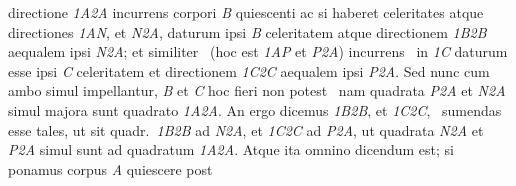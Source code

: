 %
directione \textit{{\scriptsize1}A{\scriptsize2}A} incurrens corpori \textit{B} quiescenti %
% 
%
ac si haberet celeritates atque directiones 
%
\textit{{\scriptsize1}AN}, et \textit{N{\scriptsize2}A}, daturum ipsi \textit{B}
%
celeritatem%
\protect{} atque directionem%
\protect{} \textit{{\scriptsize1}B{\scriptsize2}B} aequalem ipsi
%
\textit{N{\scriptsize2}A}; et similite\textlangle r\textrangle\ %
% 
%
(hoc est \textit{{\scriptsize1}AP} et \textit{P{\scriptsize2}A}) incurre\textlangle ns\textrangle\ %
% 
% 
%
in \textit{{\scriptsize1}C} daturum esse ipsi \textit{C} celeritatem et directionem \textit{{\scriptsize1}C{\scriptsize2}C} aequalem ipsi \textit{P{\scriptsize2}A}. 
%
Sed nunc cum ambo simul impellantur, \textit{B} et \textit{C} hoc fieri non pot\textlangle est\textrangle\
%
nam quadrata \textit{P{\scriptsize2}A} et \textit{N{\scriptsize2}A} simul majora sunt quadrato \textit{{\scriptsize1}A{\scriptsize2}A}. 
%
An ergo dicemus \textit{{\scriptsize1}B{\scriptsize2}B}, et \textit{{\scriptsize1}C{\scriptsize2}}\textlangle \textit{C},\textrangle\ 
%
sumendas esse tales, ut sit quadr.\ \textit{{\scriptsize1}B{\scriptsize2}B} ad \textit{N{\scriptsize2}A}, et  
%
\textit{{\scriptsize1}C{\scriptsize2}C} ad \textit{P{\scriptsize2}A}, ut quadrata \textit{N{\scriptsize2}A} et  
%
\textit{P{\scriptsize2}A} simul sunt ad quadratum \textit{{\scriptsize1}A{\scriptsize2}A}.  
%
Atque ita omnino dicendum est; si ponamus corpus \textit{A} quiescere post  
%
\edlabel{37_05_094-095_2a}%
%
